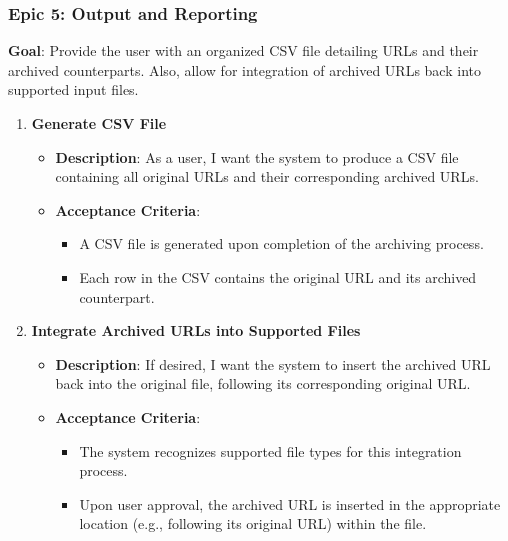 \subsubsection{Epic 5: Output and Reporting}
\textbf{Goal}: Provide the user with an organized CSV file detailing URLs and their archived counterparts. Also, allow for integration of archived URLs back into supported input files.

\begin{enumerate}
    \item \textbf{Generate CSV File}
    \begin{itemize}
        \item \textbf{Description}: As a user, I want the system to produce a CSV file containing all original URLs and their corresponding archived URLs.
        \item \textbf{Acceptance Criteria}:
        \begin{itemize}
            \item A CSV file is generated upon completion of the archiving process.
            \item Each row in the CSV contains the original URL and its archived counterpart.
        \end{itemize}
    \end{itemize}

    \item \textbf{Integrate Archived URLs into Supported Files}
    \begin{itemize}
        \item \textbf{Description}: If desired, I want the system to insert the archived URL back into the original file, following its corresponding original URL.
        \item \textbf{Acceptance Criteria}:
        \begin{itemize}
            \item The system recognizes supported file types for this integration process.
            \item Upon user approval, the archived URL is inserted in the appropriate location (e.g., following its original URL) within the file.
        \end{itemize}
    \end{itemize}
\end{enumerate}